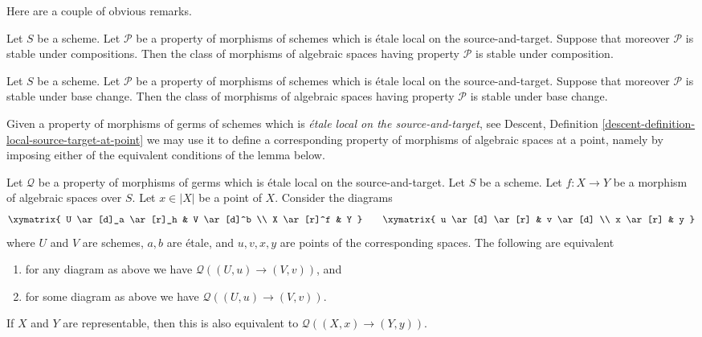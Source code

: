 \noindent
Here are a couple of obvious remarks.

\begin{remark}
\label{remark-composition-P}
Let $S$ be a scheme. Let $\mathcal{P}$ be a property of morphisms of schemes
which is \'etale local on the source-and-target. Suppose that moreover
$\mathcal{P}$ is stable under compositions. Then the class of morphisms
of algebraic spaces having property $\mathcal{P}$ is stable under composition.
\end{remark}

\begin{remark}
\label{remark-base-change-P}
Let $S$ be a scheme. Let $\mathcal{P}$ be a property of morphisms of schemes
which is \'etale local on the source-and-target. Suppose that moreover
$\mathcal{P}$ is stable under base change. Then the class of morphisms
of algebraic spaces having property $\mathcal{P}$ is stable under base change.
\end{remark}

\noindent
Given a property of morphisms of germs of schemes which is {\it \'etale local
on the source-and-target}, see
Descent, Definition \ref{descent-definition-local-source-target-at-point}
we may use it to define a corresponding property of morphisms of
algebraic spaces at a point, namely by imposing either of
the equivalent conditions of the lemma below.

\begin{lemma}
\label{lemma-local-source-target-at-point}
Let $\mathcal{Q}$ be a property of morphisms of germs which is
\'etale local on the source-and-target.
Let $S$ be a scheme.
Let $f : X \to Y$ be a morphism of algebraic spaces over $S$.
Let $x \in |X|$ be a point of $X$.
Consider the diagrams
$$
\xymatrix{
U \ar[d]_a \ar[r]_h & V \ar[d]^b \\
X \ar[r]^f & Y
}
\quad\quad
\xymatrix{
u \ar[d] \ar[r] & v \ar[d] \\
x \ar[r] & y
}
$$
where $U$ and $V$ are schemes, $a, b$ are \'etale, and $u, v, x, y$
are points of the corresponding spaces.
The following are equivalent
\begin{enumerate}
\item for any diagram as above we have $\mathcal{Q}((U, u) \to (V, v))$, and
\item for some diagram as above we have $\mathcal{Q}((U, u) \to (V, v))$.
\end{enumerate}
If $X$ and $Y$ are representable, then this is also
equivalent to $\mathcal{Q}((X, x) \to (Y, y))$.
\end{lemma}

